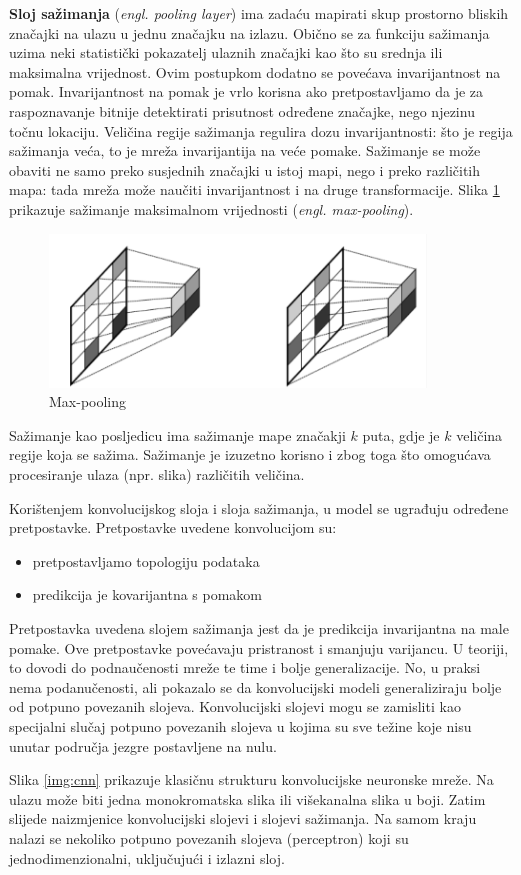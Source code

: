 \par \bigbreak
\textbf{Sloj sažimanja} (\textit{engl. pooling layer}) ima zadaću mapirati skup prostorno bliskih značajki na ulazu u jednu značajku na izlazu. Obično se za funkciju sažimanja uzima neki statistički pokazatelj ulaznih značajki kao što su srednja ili maksimalna vrijednost. Ovim postupkom dodatno se povećava invarijantnost na pomak. Invarijantnost na pomak je vrlo korisna ako pretpostavljamo da je za raspoznavanje bitnije detektirati prisutnost određene značajke, nego njezinu točnu lokaciju. Veličina regije sažimanja regulira dozu invarijantnosti: što je regija sažimanja veća, to je mreža invarijantija na veće pomake. Sažimanje se može obaviti ne samo preko susjednih značajki u istoj mapi, nego i preko različitih mapa: tada mreža može naučiti invarijantnost i na druge transformacije. Slika \ref{img:pooling} prikazuje sažimanje maksimalnom vrijednosti (\textit{engl. max-pooling}). 

\begin{figure}[htb]
\centering
\includegraphics[width=10cm]{img/Pooling.png}
\caption{Max-pooling \citep{duPredavanja}}
\label{img:pooling}
\end{figure}
Sažimanje kao posljedicu ima sažimanje mape značakji $k$ puta, gdje je $k$ veličina regije koja se sažima. Sažimanje je izuzetno korisno i zbog toga što omogućava procesiranje ulaza (npr. slika) različitih veličina. 

Korištenjem konvolucijskog sloja i sloja sažimanja, u model se ugrađuju određene pretpostavke. Pretpostavke uvedene konvolucijom su:
\begin{itemize}
\item pretpostavljamo topologiju podataka
\item predikcija je kovarijantna s pomakom
\end{itemize}
Pretpostavka uvedena slojem sažimanja jest da je predikcija invarijantna na male pomake. Ove pretpostavke povećavaju pristranost i smanjuju varijancu. U teoriji, to dovodi do podnaučenosti mreže te time i bolje generalizacije. No, u praksi nema podanučenosti, ali pokazalo se da konvolucijski modeli generaliziraju bolje od potpuno povezanih slojeva. Konvolucijski slojevi mogu se zamisliti kao specijalni slučaj potpuno povezanih slojeva u kojima su sve težine koje nisu unutar područja jezgre postavljene na nulu. 

Slika \ref{img:cnn} prikazuje klasičnu strukturu konvolucijske neuronske mreže.  Na ulazu može biti jedna monokromatska slika ili višekanalna slika u boji. Zatim slijede naizmjenice konvolucijski slojevi i slojevi sažimanja.  Na samom kraju nalazi se nekoliko potpuno povezanih slojeva (perceptron) koji su jednodimenzionalni, uključujući i izlazni sloj.


